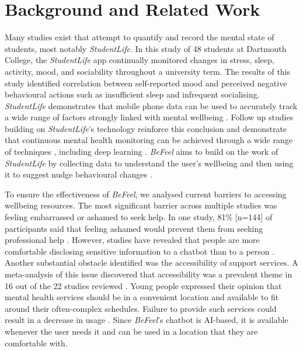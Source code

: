 \documentclass[acmsmall, screen, nonacm, 9pt, a4paper,top=2cm,bottom=2cm,left=1cm,right=1cm, marginparwidth=1cm]{acmart}
\begin{document}
\section{Background and Related Work}
Many studies exist that attempt to quantify and record the mental state of students, most notably \emph{StudentLife}. In this study of 48 students at Dartmouth College, the \emph{StudentLife} app continually monitored changes in stress, sleep, activity, mood, and sociability throughout a university term. The results of this study identified correlation between self-reported mood and perceived negative behavioural actions such as insufficient sleep and infrequent socialising. \emph{StudentLife} demonstrates that mobile phone data can be used to accurately track a wide range of factors strongly linked with mental wellbeing \cite{Wang2014StudentLife}. Follow up studies building on \emph{StudentLife}'s technology reinforce this conclusion and demonstrate that continuous mental health monitoring can be achieved through a wide range of techniques \cite{Meyer2022Article95,Wang2015SmartGPA:Students,Wang2017PredictingSensing,Wang2018TrackingSensing,Wang2018SensingTraits,Wang2020SocialSensing}, including deep learning \cite{Wang2022First-GenLens}. \emph{BeFeel} aims to build on the work of \emph{StudentLife} by collecting data to understand the user’s wellbeing and then using it to suggest nudge behavioural changes \cite{RichardH.Thaler2008Nudge:Happiness}.

To ensure the effectiveness of \emph{BeFeel}, we analysed current barriers to accessing wellbeing resources. The most significant barrier across multiple studies was feeling embarrassed or ashamed to seek help. In one study, 81\% [n=144] of participants said that feeling ashamed would prevent them from seeking professional help \cite{Salaheddin2016IdentifyingSurvey}. However, studies have revealed that people are more comfortable disclosing sensitive information to a chatbot than to a person \cite{Brandtzaeg2022MyFriendship,Brandtzaeg2021WhenChatbots}. Another substantial obstacle identified was the accessibility of support services. A meta-analysis of this issue discovered that accessibility was a prevalent theme in 16 out of the 22 studies reviewed \cite{Plaistow2014YoungServices}. Young people expressed their opinion that mental health services should be in a convenient location and available to fit around their often-complex schedules. Failure to provide such services could result in a decrease in usage \cite{Manning2009BridgingSchools}. Since \emph{BeFeel}'s chatbot is AI-based, it is available whenever the user needs it and can be used in a location that they are comfortable with.
\end{document}
